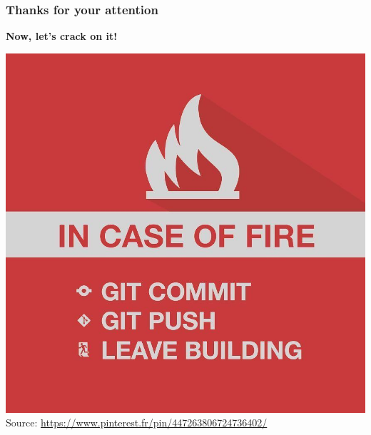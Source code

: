 \documentclass[svgnames]{beamer}
\begin{document}
\begin{frame}
    \frametitle{Thanks for your attention} %

            \begin{center}
                \textbf{Now, let's crack on it!}\\
                \vspace{2em}

                \includegraphics[scale=0.15]{img/funny.jpg}\\
                \vspace{1em}
                \tiny Source: \url{https://www.pinterest.fr/pin/447263806724736402/}
            \end{center}
\end{frame}
\end{document}
